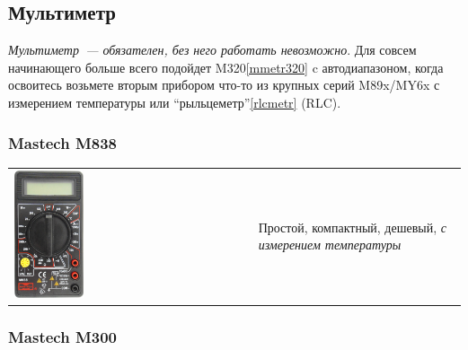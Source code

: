 \subsection{Мультиметр}\label{mmetr}

\emph{Мультиметр\ --- обязателен, без него работать невозможно}.
Для совсем начинающего больше всего подойдет M320\ref{mmetr320} c
автодиапазоном, когда освоитесь возьмете вторым прибором что-то из крупных серий
M89x/MY6x с измерением температуры
или ``рыльцеметр''\ref{rlcmetr} (RLC).

\clearpage\subsubsection{Mastech M838}\label{mmetr838}

\begin{tabular}{p{} p{}}
\noindent\includegraphics[width=0.3\textwidth]{tech/tools/mes/M838.jpg}
&
Простой, компактный, дешевый, \emph{с измерением температуры}
\\
\end{tabular}

\subsubsection{Mastech M300}\label{mmetr300}

